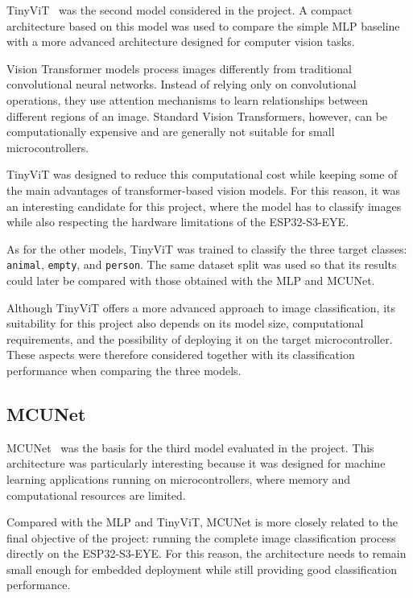 \documentclass{article}
\begin{document}
TinyViT~\cite{wu2022tinyvit} was the second model considered in the project.
A compact architecture based on this model was used to compare the simple
MLP baseline with a more advanced architecture designed for computer vision
tasks.

Vision Transformer models process images differently from traditional
convolutional neural networks. Instead of relying only on convolutional
operations, they use attention mechanisms to learn relationships between
different regions of an image. Standard Vision Transformers, however, can
be computationally expensive and are generally not suitable for small
microcontrollers.

TinyViT was designed to reduce this computational cost while keeping some
of the main advantages of transformer-based vision models. For this reason,
it was an interesting candidate for this project, where the model has to
classify images while also respecting the hardware limitations of the
ESP32-S3-EYE.

As for the other models, TinyViT was trained to classify the three target
classes: \texttt{animal}, \texttt{empty}, and \texttt{person}. The same
dataset split was used so that its results could later be compared with
those obtained with the MLP and MCUNet.

Although TinyViT offers a more advanced approach to image classification,
its suitability for this project also depends on its model size,
computational requirements, and the possibility of deploying it on the
target microcontroller. These aspects were therefore considered together
with its classification performance when comparing the three models.

\subsection{MCUNet}
\label{subsec:mcunet}

MCUNet~\cite{lin2020mcunet} was the basis for the third model evaluated in
the project. This architecture was particularly interesting because it was
designed for machine learning applications running on microcontrollers,
where memory and computational resources are limited.

Compared with the MLP and TinyViT, MCUNet is more closely related to the
final objective of the project: running the complete image classification
process directly on the ESP32-S3-EYE. For this reason, the architecture
needs to remain small enough for embedded deployment while still providing
good classification performance.
\end{document}
